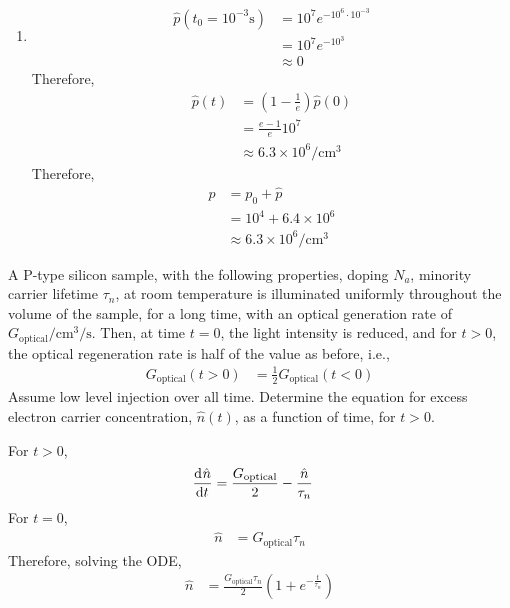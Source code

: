 \documentclass[fleqn, a4paper, 11pt, oneside]{amsart}
\theoremstyle{definition}
\theoremstyle{theorem}
\begin{document}
\begin{solution}
\begin{enumerate}[leftmargin=*]
\begin{figure}[H]
			\end{figure}
		\item
			\begin{align*}
				\hat{p}(t_0 = 10^{-3} \si{\second}) & = 10^7 e^{-10^6 \cdot 10^{-3}} \\
                                                                    & = 10^7 e^{-10^3}               \\
                                                                    & \approx 0
			\end{align*}
			Therefore,
			\begin{align*}
				\hat{p}(t) & = \left( 1 - \frac{1}{e} \right) \hat{p}(0) \\
                                           & = \frac{e - 1}{e} 10^7                      \\
                                           & \approx 6.3 \times 10^6 \si{\per\centi\metre\cubed}
			\end{align*}
			Therefore,
			\begin{align*}
				p & = p_0 + \hat{p}          \\
                                  & = 10^4 + 6.4 \times 10^6 \\
                                  & \approx 6.3 \times 10^6 \si{\per\centi\metre\cubed}
			\end{align*}
	\end{enumerate}
\end{solution}

\begin{question}
	A P-type silicon sample, with the following properties, doping $N_a$, minority carrier lifetime $\tau_n$, at room temperature is illuminated uniformly throughout the volume of the sample, for a long time, with an optical generation rate of $G_{\text{optical}} \si{\per\centi\metre\cubed\per\second}$.
	Then, at time $t = 0$, the light intensity is reduced, and for $t > 0$, the optical regeneration rate is half of the value as before, i.e.,
	\begin{align*}
		G_{\text{optical}}(t > 0) & = \frac{1}{2} G_{\text{optical}}(t < 0)
	\end{align*}
	Assume low level injection over all time.
	Determine the equation for excess electron carrier concentration, $\hat{n}(t)$, as a function of time, for $t > 0$.
\end{question}

\begin{solution}
	For $t > 0$,
	\begin{align*}
		\dod{\hat{n}}{t} & = \frac{G_{\text{optical}}}{2} - \frac{\hat{n}}{\tau_n}
	\end{align*}
	For $t = 0$,
	\begin{align*}
		\hat{n} & = G_{\text{optical}} \tau_n
	\end{align*}
	Therefore, solving the ODE,
	\begin{align*}
		\hat{n} & = \frac{G_{\text{optical}} \tau_n}{2} \left( 1 + e^{-\frac{t}{\tau_n}} \right)
	\end{align*}
\end{solution}
\end{document}

